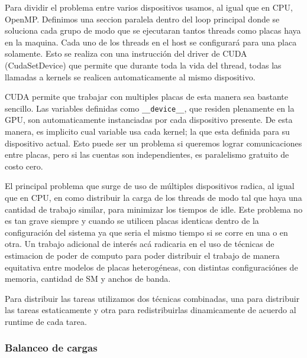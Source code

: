 Para dividir el problema entre varios dispositivos usamos, al igual que en CPU, OpenMP. Definimos
una seccion paralela dentro del loop principal donde se soluciona cada grupo de modo que se
ejecutaran tantos threads como placas haya en la maquina. Cada
uno de los threads en el host se configurar\'a para una placa solamente. Esto se realiza con
una instrucci\'on del driver de CUDA (CudaSetDevice) que permite que durante toda la vida del
thread, todas las llamadas a kernels se realicen automaticamente al mismo dispositivo.

CUDA permite que trabajar con multiples placas de esta manera sea bastante sencillo. Las variables
definidas como \texttt{\_\_device\_\_}, que residen plenamente en la GPU, son automaticamente instanciadas
por cada dispositivo presente. De esta manera, es implicito cual variable usa cada kernel; la que
esta definida para su dispositivo actual. Esto puede ser un problema si queremos lograr comunicaciones entre placas,
pero si las cuentas son independientes, es paralelismo gratuito de costo cero.

El principal problema que surge de uso de m\'ultiples dispositivos radica, al igual que en
CPU, en como distribuir la carga de los threads de modo tal que haya una cantidad de trabajo
similar, para minimizar los tiempos de idle. Este problema no es tan grave siempre y cuando
se utilicen placas identicas dentro de la configuraci\'on del sistema ya que seria
el mismo tiempo si se corre en una o en otra. Un trabajo adicional de inter\'es ac\'a
radicaria en el uso de t\'ecnicas de estimacion de poder de computo para poder
distribuir el trabajo de manera equitativa entre modelos de placas heterog\'eneas, con distintas
configuraci\'ones de memoria, cantidad de SM y anchos de banda.

Para distribuir las tareas utilizamos dos t\'ecnicas combinadas, una para distribuir las
tareas estaticamente y otra para redistribuirlas dinamicamente de acuerdo al runtime de
cada tarea.

\subsubsection{Balanceo de cargas}

